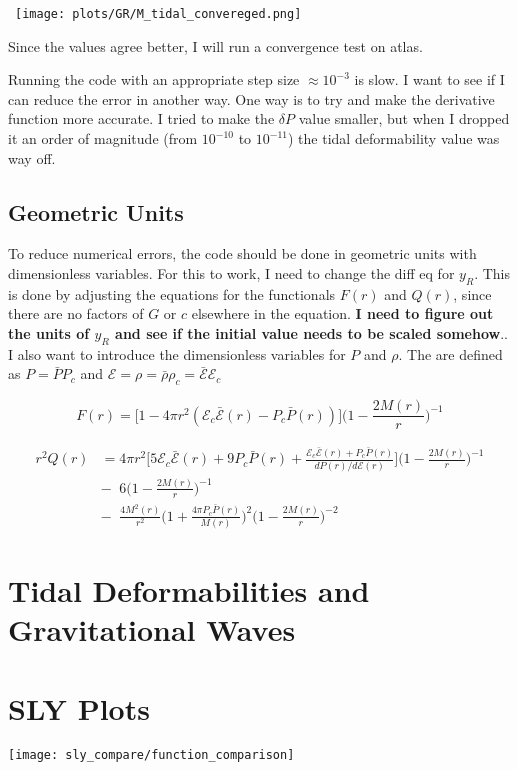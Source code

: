 \documentclass[11pt]{article}
\numberwithin{equation}{section}
\begin{document}
\begin{center}
\hbox{
\texttt{[image: plots/GR/M\_tidal\_convereged.png]}}
\end{center}

Since the values agree better, I will run a convergence test on atlas.  

Running the code with an appropriate step size $\approx 10^{-3}$ is slow.  I want to see if I can reduce the error in another way.  One way is to try and make the derivative function more accurate.  I tried to make the $\delta P$ value smaller, but when I dropped it an order of magnitude (from $10^{-10}$ to $10^{-11}$) the tidal deformability value was way off.  
 
 


\subsection{Geometric Units} 

To reduce numerical errors, the code should be done in geometric units with dimensionless variables.  For this to work, I need to change the diff eq for $y_R$.  This is done by adjusting the equations  for the functionals $F(r)$ and $Q(r)$, since there are no factors of $G$ or $c$ elsewhere in the equation. \textbf{I need to figure out the units of $y_R$ and see if the initial value needs to be scaled somehow}..  I also want to introduce the dimensionless variables for $P$ and $\rho$.  The are defined as $P = \bar{P} P_c$ and $\mathcal{E} = \rho = \bar{\rho} \rho_{c} = \bar{\mathcal{E}} \mathcal{E}_{c}$

\begin{equation} 
F(r) = \bigg[ 1- 4 \pi r^{2} (\mathcal{E}_{c}\bar{\mathcal{E}}(r)-P_{c}\bar{P}(r))  \bigg] \bigg( 1-\frac{2 M(r) }{r}  \bigg)^{-1}
\end{equation}

\begin{align} 
r^{2} Q(r) &= 4 \pi r^{2} \bigg[ 5 \mathcal{E}_{c}\bar{\mathcal{E}}(r)+ 9 P_{c}\bar{P}(r) + \frac{\mathcal{E}_{c}\bar{\mathcal{E}}(r) + P_{c}\bar{P}(r)}{dP(r)/d\mathcal{E}(r)}   \bigg] \bigg(  1 - \frac{2 M(r)}{r} \bigg) ^{-1} \\
& - \;\; 6 \bigg( 1- \frac{2 M(r) }{r }  \bigg)^{-1} \nonumber \\	
& - \;\; \frac{4 M^{2}(r)}{r^{2}} \bigg( 1 + \frac{4 \pi P_{c} \bar{P}(r)}{M(r)}  \bigg)^{2} \bigg( 1 - \frac{2 M(r)}{r} \bigg)^{-2} \nonumber
\end{align}







\section{Tidal Deformabilities and Gravitational Waves}

\clearpage

\section{SLY Plots}

\texttt{[image: sly\_compare/function\_comparison]} \\



\end{document}
